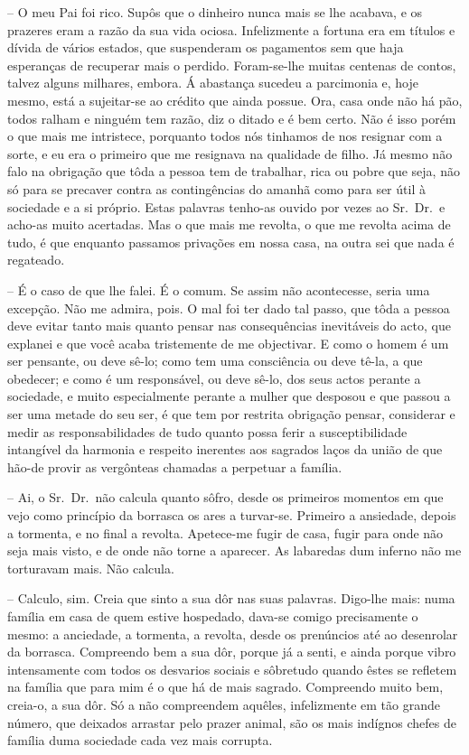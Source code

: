 \documentclass[9pt]{article}
\begin{document}
-- O meu Pai foi rico. Supôs que o dinheiro nunca mais se lhe acabava, e
os prazeres eram a razão da sua vida ociosa. Infelizmente  a fortuna era em títulos
e dívida de vários estados, que suspenderam os pagamentos sem que haja esperan\-ças de recuperar mais o perdido. Foram-se-\-lhe muitas centenas de contos, talvez alguns mi\-lhares, embora. Á abastan\-ça sucedeu a parcimonia e, hoje
mesmo, está a sujei\-\mbox{tar-se} ao crédito que ainda possue. Ora, casa onde não há
pão, todos ra\-lham e nin\-guém tem razão, diz o ditado e é bem certo. Não é isso porém o que mais me intristece, porquanto todos nós tinhamos de nos resignar com a sorte, e eu era o primeiro que me resignava na qualidade de
fi\-lho. Já mesmo não falo na obriga\-ção que tôda a pessoa tem de traba\-lhar, rica
ou pobre que seja, não só para se precaver contra as contingências do
a\-ma\-nhã como para ser útil à sociedade e a si próprio. Estas palavras tenho-as ouvido por vezes ao Sr.\ Dr.\ e acho-as muito acertadas. Mas o que mais
me revolta, o que me revolta acima de tudo, é que enquanto passamos priva\-ções
em nossa casa, na outra sei que nada é regateado.

-- É o caso de que lhe falei. É o comum. Se assim não acontecesse, seria
uma excep\-ção. Não me admira, pois. O mal foi ter dado tal passo, que tôda a
pessoa deve evitar tanto mais quanto pensar nas consequências inevitáveis
do acto, que explanei e que você acaba tristemente de me objectivar. E como o
homem é um ser pensante, ou deve sê-lo; como tem uma consciência ou deve tê-la, a que obedecer; e como é um responsável, ou deve sê-lo, dos seus actos
perante a sociedade, e muito especialmente perante a mu\-lher que desposou e
que passou a ser uma metade do seu ser, é que tem por restrita obriga\-ção
pensar, considerar e medir as responsabilidades de tudo quanto possa ferir
a susceptibilidade intangível da harmonia e respeito inerentes aos sagrados
laços da união de que hão-de provir as vergônteas chamadas a perpetuar a
fa\-mí\-lia.

-- Ai, o Sr.\ Dr.\ não calcula quanto sôfro, desde os primeiros momentos
em que vejo como princípio da borrasca os ares a turvar-se. Primeiro a
ansiedade, depois a tormenta, e no final a revolta. Apetece-me fugir de casa,
fugir para onde não seja mais visto, e de onde não torne a aparecer. As labaredas
dum inferno não me torturavam mais. Não calcula.

-- Calculo, sim. Creia que sinto a sua dôr nas suas palavras. Di\-\mbox{go-lhe}
mais: numa fa\-mí\-lia em casa de quem estive hospedado, da\-\mbox{va-se} comigo precisamente o mesmo: a anciedade, a tormenta, a revolta, desde os prenúncios até ao
desenrolar da borrasca. Compreendo bem a sua dôr, porque já a senti, e ainda
porque vibro intensamente com todos os desvarios sociais e sôbretudo quan\-do êstes se refletem na fa\-mí\-lia que para mim é o que há de mais sagrado.
Compreendo muito bem, creia-o, a sua dôr. Só a não compreendem a\-quê\-les, infelizmente em tão gran\-de número, que deixados arrastar pelo prazer animal,
são os mais indígnos chefes de família duma sociedade cada vez mais corrupta.
\end{document}
